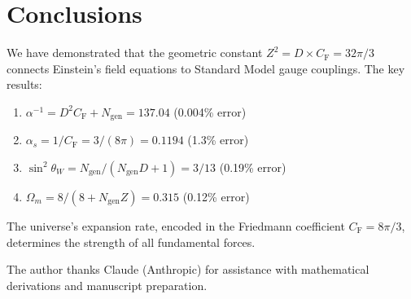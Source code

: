 \documentclass[aps,prd,twocolumn,superscriptaddress,nofootinbib]{revtex4-2}
\newcommand{\Zs}{Z^2}
\newcommand{\CF}{C_{\mathrm{F}}}
\newcommand{\Ngen}{N_{\mathrm{gen}}}
\newcommand{\sinW}{\sin^2\theta_W}
\newcommand{\alphas}{\alpha_s}
\newcommand{\alphainv}{\alpha^{-1}}
\newcommand{\Omegam}{\Omega_m}
\begin{document}
\section{Conclusions}
\label{sec:conclusions}

We have demonstrated that the geometric constant $\Zs = D \times \CF = 32\pi/3$ connects Einstein's field equations to Standard Model gauge couplings. The key results:

\begin{enumerate}
\item $\alphainv = D^2 \CF + \Ngen = 137.04$ (0.004\% error)
\item $\alphas = 1/\CF = 3/(8\pi) = 0.1194$ (1.3\% error)
\item $\sinW = \Ngen/(\Ngen D + 1) = 3/13$ (0.19\% error)
\item $\Omegam = 8/(8 + \Ngen Z) = 0.315$ (0.12\% error)
\end{enumerate}

The universe's expansion rate, encoded in the Friedmann coefficient $\CF = 8\pi/3$, determines the strength of all fundamental forces.

\begin{acknowledgments}
The author thanks Claude (Anthropic) for assistance with mathematical derivations and manuscript preparation.
\end{acknowledgments}


\end{document}

